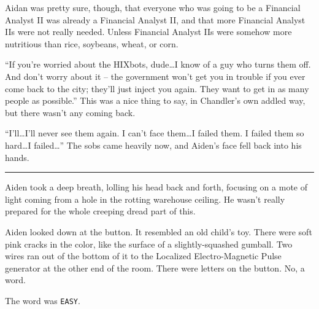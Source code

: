 \documentclass[11pt]{book}
\begin{document}
	Aidan was pretty sure, though, that everyone who was going to be a Financial Analyst II was already a Financial Analyst II, and that more Financial Analyst IIs were not really needed. Unless Financial Analyst IIs were somehow more nutritious than rice, soybeans, wheat, or corn.
		
	``If you're worried about the HIXbots, dude\dots I know of a guy who turns them off. And don't worry about it -- the government won't get you in trouble if you ever come back to the city; they'll just inject you again. They want to get in as many people as possible.'' This was a nice thing to say, in Chandler's own addled way, but there wasn't any coming back.
	
	``I'll\dots I'll never see them again. I can't face them\dots I failed them. I failed them so hard\dots I failed\dots'' The sobs came heavily now, and Aiden's face fell back into his hands.
	
	\vspace{0.5cm}
	\hrule
	\vspace{0.5cm}
	
	Aiden took a deep breath, lolling his head back and forth, focusing on a mote of light coming from a hole in the rotting warehouse ceiling. He wasn't really prepared for the whole creeping dread part of this.
	
	Aiden looked down at the button. It resembled an old child's toy. There were soft pink cracks in the color, like the surface of a slightly-squashed gumball. Two wires ran out of the bottom of it to the Localized Electro-Magnetic Pulse generator at the other end of the room. There were letters on the button. No, a word.
	
	The word was \texttt{EASY}.
	
\end{document}
